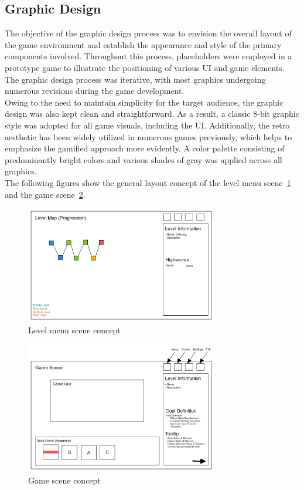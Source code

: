 \subsection{Graphic Design}\label{subsec:graphic-design}
The objective of the graphic design process was to envision the overall layout of the game environment and establish the
appearance and style of the primary components involved.
Throughout this process, placeholders were employed in a prototype game to illustrate the positioning of various \gls{UI} and game elements.
The graphic design process was iterative, with most graphics undergoing numerous revisions during the game development.
\\
Owing to the need to maintain simplicity for the target audience, the graphic design was also kept clean and straightforward.
As a result, a classic 8-bit graphic style was adopted for all game visuals, including the UI. Additionally,
the retro aesthetic has been widely utilized in numerous games previously, which helps to emphasize the gamified approach more evidently.
A color palette consisting of predominantly bright colors and various shades of gray was applied across all graphics.
\\
The following figures show the general layout concept of the level
menu scene~\ref{fig:level-menu-scene-concept} and the game scene~\ref{fig:game-scene-concept}.
\begin{figure}
    \includegraphics[width=0.75\textwidth]{Pictures/res/concept/level-menu-scene-concept}
    \caption{Level menu scene concept}
    \label{fig:level-menu-scene-concept}
\end{figure}
\begin{figure}
    \includegraphics[width=0.75\textwidth]{Pictures/res/concept/game-scene-concept}
    \caption{Game scene concept}
    \label{fig:game-scene-concept}
\end{figure}
